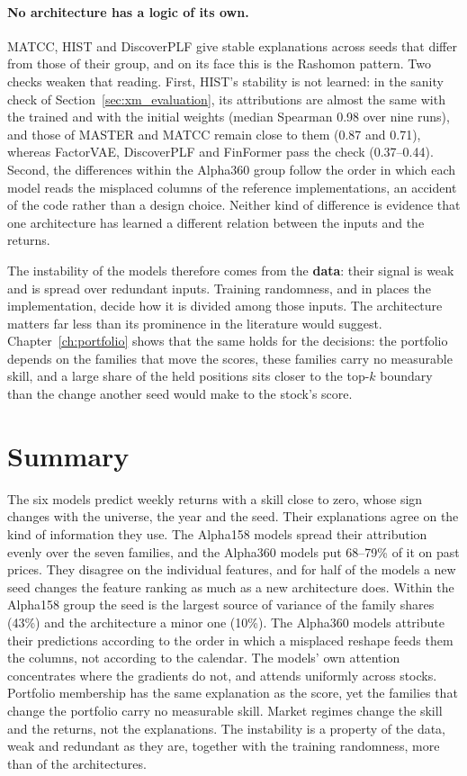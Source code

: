 \paragraph{No architecture has a logic of its own.} MATCC, HIST and DiscoverPLF give stable explanations across seeds that differ from those of their group, and on its face this is the Rashomon pattern. Two checks weaken that reading. First, HIST's stability is not learned: in the sanity check of Section~\ref{sec:xm_evaluation}, its attributions are almost the same with the trained and with the initial weights (median Spearman 0.98 over nine runs), and those of MASTER and MATCC remain close to them (0.87 and 0.71), whereas FactorVAE, DiscoverPLF and FinFormer pass the check (0.37--0.44).
Second, the differences within the Alpha360 group follow the order in which each model reads the misplaced columns of the reference implementations, an accident of the code rather than a design choice. Neither kind of difference is evidence that one architecture has learned a different relation between the inputs and the returns.

The instability of the models therefore comes from the \textbf{data}: their signal is weak and is spread over redundant inputs. Training randomness, and in places the implementation, decide how it is divided among those inputs. The architecture matters far less than its prominence in the literature would suggest. Chapter~\ref{ch:portfolio} shows that the same holds for the decisions: the portfolio depends on the families that move the scores, these families carry no measurable skill, and a large share of the held positions sits closer to the top-$k$ boundary than the change another seed would make to the stock's score.

\section{Summary}
\label{sec:res_summary}

The six models predict weekly returns with a skill close to zero, whose sign changes with the universe, the year and the seed. Their explanations agree on the kind of information they use. The Alpha158 models spread their attribution evenly over the seven families, and the Alpha360 models put 68--79\% of it on past prices. They disagree on the individual features, and for half of the models a new seed changes the feature ranking as much as a new architecture does. Within the Alpha158 group the seed is the largest source of variance of the family shares (43\%) and the architecture a minor one (10\%). The Alpha360 models attribute their predictions according to the order in which a misplaced reshape feeds them the columns, not according to the calendar. The models' own attention concentrates where the gradients do not, and attends uniformly across stocks. Portfolio membership has the same explanation as the score, yet the families that change the portfolio carry no measurable skill. Market regimes change the skill and the returns, not the explanations. The instability is a property of the data, weak and redundant as they are, together with the training randomness, more than of the architectures.
